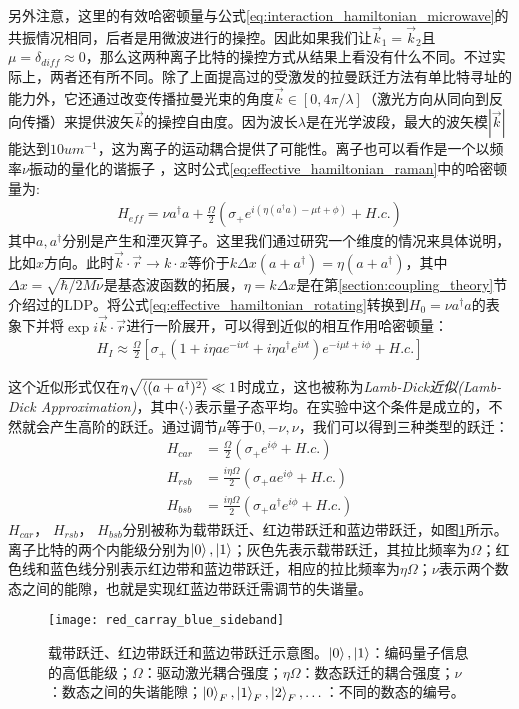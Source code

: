 另外注意，这里的有效哈密顿量与公式\eqref{eq:interaction_hamiltonian_microwave}的共振情况相同，后者是用微波进行的操控。因此如果我们让$\vec{k}_1=\vec{k}_2$且$\mu=\delta_{diff}\approx0$，那么这两种离子比特的操控方式从结果上看没有什么不同。不过实际上，两者还有所不同。除了上面提高过的受激发的拉曼跃迁方法有单比特寻址的能力外，它还通过改变传播拉曼光束的角度$\vec{k}\in[0,4\pi/\lambda]$（激光方向从同向到反向传播）来提供波矢$\vec{k}$的操控自由度。因为波长$\lambda$是在光学波段，最大的波矢模$|\vec{k}|$能达到$10um^{-1}$，这为离子的运动耦合提供了可能性。离子也可以看作是一个以频率$\nu$振动的量化的谐振子
，这时公式\eqref{eq:effective_hamiltonian_raman}中的哈密顿量为:
\begin{align}
    H_{eff}=\nu a^\dagger a+\frac{\Omega}{2}\left(\sigma_+e^{i(\eta(a^\dagger a)-\mu t+\phi)}+H.c.\right) \label{eq:effective_hamiltonian_rotating}
\end{align}
其中$a,a^\dagger$分别是产生和湮灭算子。这里我们通过研究一个维度的情况来具体说明，比如$x$方向。此时$\vec{k}\cdot\vec{r}\to k\cdot x$等价于$k\Delta x(a+a^\dagger)=\eta(a+a^\dagger)$，其中$\Delta x=\sqrt{\hbar/2M\nu}$是基态波函数的拓展，$\eta=k\Delta x$是在第\ref{section:coupling_theory}节介绍过的LDP。将公式\eqref{eq:effective_hamiltonian_rotating}转换到$H_0=\nu a^\dagger a$的表象下并将$\exp{i\vec{k}\cdot \vec{r}}$进行一阶展开，可以得到近似的相互作用哈密顿量：
\begin{align}
    H_I\approx\frac{\Omega}{2}\left[\sigma_+(1+i\eta a e^{-i\nu t}+i\eta a^\dagger e^{i\nu t})e^{-i\mu t+i\phi}+H.c.\right]
\end{align}

这个近似形式仅在$\eta\sqrt{\braket{(a+a^\dagger)^2}}\ll1$时成立，这也被称为\emph{Lamb-Dick近似(Lamb-Dick Approximation)}，其中$\braket{\cdot}$表示量子态平均。在实验中这个条件是成立的，不然就会产生高阶的跃迁。通过调节$\mu$等于$0,-\nu,\nu$，我们可以得到三种类型的跃迁：
\begin{align}
    H_{car}&=\frac{\Omega}{2}(\sigma_+e^{i\phi}+H.c.)\\
    H_{rsb}&=\frac{i\eta\Omega}{2}(\sigma_+ae^{i\phi}+H.c.)\\
    H_{bsb}&=\frac{i\eta\Omega}{2}(\sigma_+a^\dagger e^{i\phi}+H.c.)
\end{align}
$H_{car}$， $H_{rsb}$， $H_{bsb}$分别被称为载带跃迁、红边带跃迁和蓝边带跃迁，如图\ref{fig:red_carray_blue_sideband}所示。离子比特的两个内能级分别为$\ket{0},\ket{1}$；灰色先表示载带跃迁，其拉比频率为$\Omega$；红色线和蓝色线分别表示红边带和蓝边带跃迁，相应的拉比频率为$\eta \Omega$；$\nu$表示两个数态之间的能隙，也就是实现红蓝边带跃迁需调节的失谐量。
\begin{figure}
    \centering
    \caption[载带跃迁、红边带跃迁和蓝边带跃迁示意图]{载带跃迁、红边带跃迁和蓝边带跃迁示意图。$\ket{0},\ket{1}$：编码量子信息的高低能级；$\Omega$：驱动激光耦合强度；$\eta \Omega$：数态跃迁的耦合强度；$\nu$：数态之间的失谐能隙；$\ket{0}_F,\ket{1}_F,\ket{2}_F,\dots$：不同的数态的编号。\label{fig:red_carray_blue_sideband}}
    \texttt{[image: red\_carray\_blue\_sideband]}
\end{figure}

